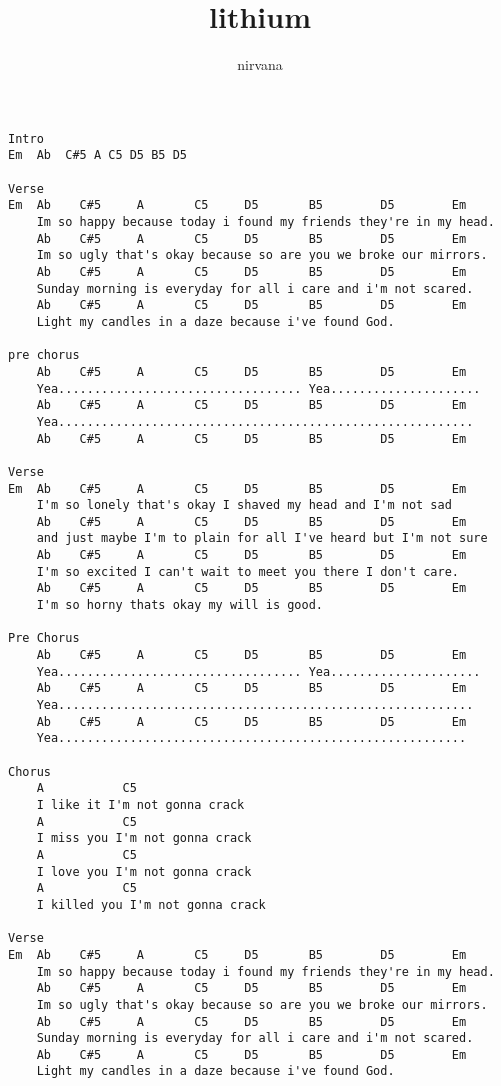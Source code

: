 \author{nirvana}
\title{lithium}
\maketitle
\begin{verbatim}
Intro
Em  Ab  C#5 A C5 D5 B5 D5

Verse
Em  Ab    C#5     A       C5     D5       B5        D5        Em
    Im so happy because today i found my friends they're in my head.
    Ab    C#5     A       C5     D5       B5        D5        Em
    Im so ugly that's okay because so are you we broke our mirrors. 
    Ab    C#5     A       C5     D5       B5        D5        Em
    Sunday morning is everyday for all i care and i'm not scared.
    Ab    C#5     A       C5     D5       B5        D5        Em
    Light my candles in a daze because i've found God.  

pre chorus
    Ab    C#5     A       C5     D5       B5        D5        Em
    Yea.................................. Yea.....................
    Ab    C#5     A       C5     D5       B5        D5        Em
    Yea..........................................................
    Ab    C#5     A       C5     D5       B5        D5        Em

Verse
Em  Ab    C#5     A       C5     D5       B5        D5        Em
    I'm so lonely that's okay I shaved my head and I'm not sad
    Ab    C#5     A       C5     D5       B5        D5        Em
    and just maybe I'm to plain for all I've heard but I'm not sure
    Ab    C#5     A       C5     D5       B5        D5        Em
    I'm so excited I can't wait to meet you there I don't care.
    Ab    C#5     A       C5     D5       B5        D5        Em
    I'm so horny thats okay my will is good. 

Pre Chorus     
    Ab    C#5     A       C5     D5       B5        D5        Em
    Yea.................................. Yea.....................
    Ab    C#5     A       C5     D5       B5        D5        Em
    Yea..........................................................
    Ab    C#5     A       C5     D5       B5        D5        Em
    Yea.........................................................

Chorus
    A           C5     
    I like it I'm not gonna crack      
    A           C5     
    I miss you I'm not gonna crack
    A           C5     
    I love you I'm not gonna crack 
    A           C5     
    I killed you I'm not gonna crack

Verse
Em  Ab    C#5     A       C5     D5       B5        D5        Em
    Im so happy because today i found my friends they're in my head.
    Ab    C#5     A       C5     D5       B5        D5        Em
    Im so ugly that's okay because so are you we broke our mirrors. 
    Ab    C#5     A       C5     D5       B5        D5        Em
    Sunday morning is everyday for all i care and i'm not scared.
    Ab    C#5     A       C5     D5       B5        D5        Em
    Light my candles in a daze because i've found God.  


\end{verbatim}

